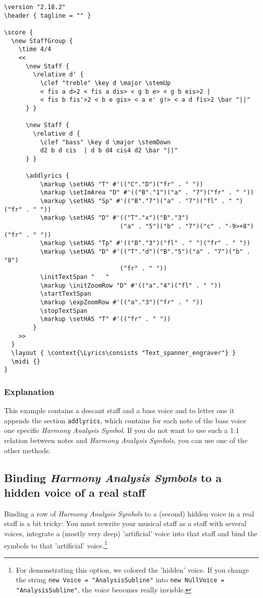 \documentclass[
  DIV=calc,
  BCOR=5mm,
  12pt,
  headings=small,
  oneside,
  abstract=true,
  toc=bib,
  xcolor=dvipsnames,
  openany,
  ngerman,english]{scrartcl}
\newcommand{\has}[1]{\textit{Harmony Analysis Symbol#1}}
\begin{document}
\begin{scriptsize}
\begin{verbatim}
\version "2.18.2"
\header { tagline = "" }

\score {
  \new StaffGroup {
    \time 4/4
    <<
      \new Staff {
        \relative d' {
          \clef "treble" \key d \major \stemUp
          < fis a d>2 < fis a dis> < g b e> < g b eis>2 | 
          < fis b fis'>2 < b e gis> < a e' g!> < a d fis>2 \bar "||"
      } }   

      \new Staff {
        \relative d { 
          \clef "bass" \key d \major \stemDown
          d2 b d cis  | d b d4 cis4 d2 \bar "||"
      } }   
      
      \addlyrics {
          \markup \setHAS "T" #'(("C"."D")("fr" . " "))
          \markup \setImArea "D" #'(("B"."1")("a" . "7")("fr" . " "))
          \markup \setHAS "Sp" #'(("B"."7")("a" . "7")("fl" . " ")("fr" . " "))
          \markup \setHAS "D" #'(("T"."x")("B"."3")
                                ("a" . "5")("b" . "7")("c" . "-9>+8")("fr" . " "))
          \markup \setHAS "Tp" #'(("B"."3")("fl" . " ")("fr" . " ")) 
          \markup \setHAS "D" #'(("T"."d")("B"."5")("a" . "7")("b" . "8")
                                ("fr" . " "))    
          \initTextSpan "   "
          \markup \initZoomRow "D" #'(("a"."4")("fl" . " "))
          \startTextSpan
          \markup \expZoomRow #'(("a"."3")("fr" . " ")) 
          \stopTextSpan
          \markup \setHAS "T" #'(("fr" . " "))
        }
    >>
  }
  \layout { \context{\Lyrics\consists "Text_spanner_engraver"} }
  \midi {}
}
\end{verbatim}
\end{scriptsize}

\subsubsection{Explanation}

This example contains a descant staff and a bass voice and to letter one it
appends the section \texttt{addlyrics}, which contains for each note of the bass
voice one specific \has. If you do not want to use such a 1:1 relation between
notes and \has{s}, you can use one of the other methods.

\subsection{Binding \has{s} to a hidden voice of a real staff}

Binding a row of \has{s} to a (second) hidden voice in a real staff is a bit
tricky: You must rewrite your musical staff as a staff with several voices,
integrate a (mostly very deep) 'artificial' voice into that staff and bind the
symbols to that 'artificial' voice.\footnote{For demonstrating this option, we
colored the 'hidden' voice. If you change the string \texttt{new Voice =
"AnalysisSubline"} into \texttt{new NullVoice = "AnalysisSubline"}, the voice
beoomes really invisble.}
\end{document}
